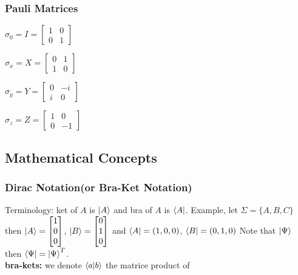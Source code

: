 \documentclass[5pt]{article}
\begin{document}
\begin{multicols}{3}
\subsubsection{Pauli Matrices}
\begin{itemize*}
     \item $\sigma_0 = I = \begin{bmatrix}1 & 0 \\ 0 & 1\end{bmatrix}$
     \item $\sigma_x = X = \begin{bmatrix}0 & 1 \\ 1 & 0\end{bmatrix}$
     \item $\sigma_y = Y = \begin{bmatrix}0 & -i \\ i & 0\end{bmatrix}$
     \item $\sigma_z = Z = \begin{bmatrix}1 & 0 \\ 0 & -1\end{bmatrix}$
\end{itemize*}




\newpage





\subsection{Mathematical Concepts}

\subsubsection{Dirac Notation\footnotesize{(or Bra-Ket Notation)}}
Terminology: ket of $A$ is $\ket{A}$ and bra of $A$ is $\bra{A}$.
Example, let $\Sigma=\{A,B,C\}$ then $\ket{A}=\begin{bmatrix}1\\0\\0 \end{bmatrix}$, $\ket{B}=\begin{bmatrix}0\\1\\0 \end{bmatrix}$
and $\bra{A}=(1,0,0)$, $\bra{B}=(0,1,0)$
Note that $\ket{\Psi}$ then $\bra{\Psi}=\ket{\Psi}^T$.\\
\textbf{bra-kets:} we denote $\braket{a}{b}$ the matrice product of 



\end{multicols}
\end{document}
